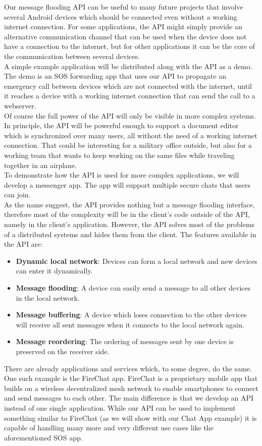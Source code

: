Our message flooding API can be useful to many future projects that involve several Android devices which should be connected even without a working internet connection. For some applications, the API might simply provide an alternative communication channel that can be used when the device does not have a connection to the internet, but for other applications it can be the core of the communication between several devices. \\
A simple example application will be distributed along with the API as a demo. The demo is an SOS forwarding app that uses our API to propagate an emergency call between devices which are not connected with the internet, until it reaches a device with a working internet connection that can send the call to a webserver. \\
Of course the full power of the API will only be visible in more complex systems. In principle, the API will be powerful enough to support a document editor which is synchronized over many users, all without the need of a working internet connection. That could be interesting for a military office outside, but also for a working team that wants to keep working on the same files while traveling together in an airplane.\\
To demonstrate how the API is used for more complex applications, we will develop a messenger app. The app will support multiple secure chats that users can join. \\
As the name suggest, the API provides nothing but a message flooding interface, therefore most of the complexity will be in the client's code outside of the API, namely in the client's application. However, the API solves most of the problems of a distributed systems and hides them from the client. The features available in the API are:
\begin{itemize}
	\item {\bf Dynamic local network}: Devices can form a local network and new devices can enter it dynamically.
	\item {\bf Message flooding}: A device can easily send a message to all other devices in the local network.
	\item {\bf Message buffering}: A device which loses connection to the other devices will receive all sent messages when it connects to the local network again.
	\item {\bf Message reordering}: The ordering of messages sent by one device is preserved on the receiver side.
\end{itemize}
There are already applications and services which, to some degree, do the same. One such example is the FireChat\cite{FireChat} app. FireChat is a proprietary mobile app that builds on a wireless decentralized mesh network to enable smartphones to connect and send messages to each other. The main difference is that we develop an API instead of one single application. While our API can be used to implement something similar to FireChat (as we will show with our Chat App example) it is capable of handling many more and very different use cases like the aforementioned SOS app.

